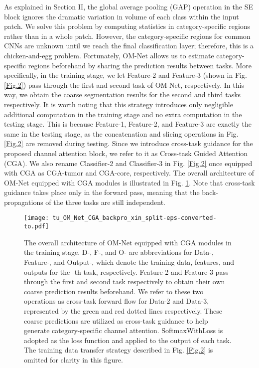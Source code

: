 \documentclass[journal,twoside]{IEEEtran}
\begin{document}
As explained in Section II, the global average pooling (GAP) operation in the SE block ignores the dramatic variation in volume of each class within the input patch. We solve this problem by computing statistics in category-specific regions rather than in a whole patch. However, the category-specific regions for common CNNs are unknown until we reach the final classification layer; therefore, this is a chicken-and-egg problem. Fortunately, OM-Net allows us to estimate category-specific regions beforehand by sharing the prediction results between tasks. More specifically, in the training stage, we let Feature-2 and Feature-3 (shown in Fig. \ref{Fig.2}) pass through the first and second task of OM-Net, respectively. In this way, we obtain the coarse segmentation results for the second and third tasks respectively. It is worth noting that this strategy introduces only negligible additional computation in the training stage and no extra computation in the testing stage. This is because Feature-1, Feature-2, and Feature-3 are exactly the same in the testing stage, as the concatenation and slicing operations in Fig. \ref{Fig.2} are removed during testing. 
Since we introduce cross-task guidance for the proposed channel attention block, we refer to it as Cross-task Guided Attention (CGA). We also rename Classifier-2 and Classifier-3 in Fig. \ref{Fig.2} once equipped with CGA as CGA-tumor and CGA-core, respectively. The overall architecture of OM-Net equipped with CGA modules is illustrated in Fig. \ref{Fig.3}. Note that cross-task guidance takes place only in the forward pass, meaning that the back-propagations of the three tasks are still independent. 

\begin{figure}
	\centering 
	\texttt{[image: tu\_OM\_Net\_CGA\_backpro\_xin\_split-eps-converted-to.pdf]}
	\caption{The overall architecture of OM-Net equipped with CGA modules in the training stage. D-, F-, and O- are abbreviations for Data-, Feature-, and Output-, which denote the training data, features, and outputs for the -th task, respectively. Feature-2 and Feature-3 pass through the first and second task respectively to obtain their own coarse prediction results beforehand. We refer to these two operations as cross-task forward flow for Data-2 and Data-3, represented by the green and red dotted lines respectively. These coarse predictions are utilized as cross-task guidance to help generate category-specific channel attention. SoftmaxWithLoss is adopted as the loss function and applied to the output of each task. The training data transfer strategy described in Fig. \ref{Fig.2} is omitted for clarity in this figure. 
	}
	\label{Fig.3}
	
\end{figure}
\end{document}
